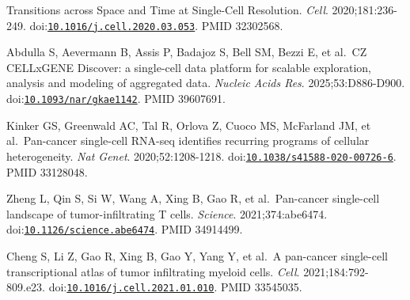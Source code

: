 \documentclass[11pt]{article}
\begin{document}
\begin{enumerate}[label={[\arabic*]},leftmargin=2.6em,labelsep=0.5em,itemsep=1.5pt]
  Transitions across Space and Time at Single-Cell Resolution.
  \emph{Cell}. 2020;181:236-249.
  doi:\href{https://doi.org/10.1016/j.cell.2020.03.053}{\nolinkurl{10.1016/j.cell.2020.03.053}}.
  PMID 32302568.
\item
  Abdulla S, Aevermann B, Assis P, Badajoz S, Bell SM, Bezzi E, et
  al.~CZ CELLxGENE Discover: a single-cell data platform for scalable
  exploration, analysis and modeling of aggregated data. \emph{Nucleic
  Acids Res}. 2025;53:D886-D900.
  doi:\href{https://doi.org/10.1093/nar/gkae1142}{\nolinkurl{10.1093/nar/gkae1142}}.
  PMID 39607691.
\item
  Kinker GS, Greenwald AC, Tal R, Orlova Z, Cuoco MS, McFarland JM, et
  al.~Pan-cancer single-cell RNA-seq identifies recurring programs of
  cellular heterogeneity. \emph{Nat Genet}. 2020;52:1208-1218.
  doi:\href{https://doi.org/10.1038/s41588-020-00726-6}{\nolinkurl{10.1038/s41588-020-00726-6}}.
  PMID 33128048.
\item
  Zheng L, Qin S, Si W, Wang A, Xing B, Gao R, et al.~Pan-cancer
  single-cell landscape of tumor-infiltrating T cells. \emph{Science}.
  2021;374:abe6474.
  doi:\href{https://doi.org/10.1126/science.abe6474}{\nolinkurl{10.1126/science.abe6474}}.
  PMID 34914499.
\item
  Cheng S, Li Z, Gao R, Xing B, Gao Y, Yang Y, et al.~A pan-cancer
  single-cell transcriptional atlas of tumor infiltrating myeloid cells.
  \emph{Cell}. 2021;184:792-809.e23.
  doi:\href{https://doi.org/10.1016/j.cell.2021.01.010}{\nolinkurl{10.1016/j.cell.2021.01.010}}.
  PMID 33545035.
\end{enumerate}
\endgroup
\end{document}
